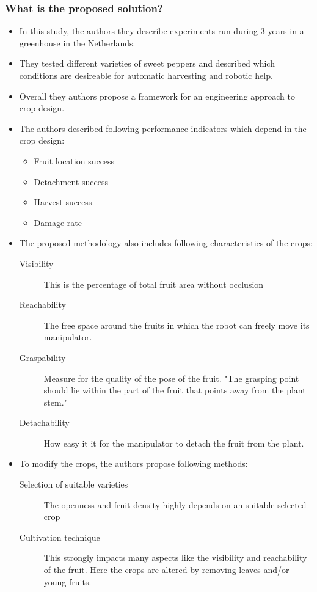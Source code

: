     \subsubsection*{What is the proposed solution?}
    \begin{itemize}
        \item In  this study, the authors they describe experiments run during 3 years in a greenhouse in the Netherlands.
        \item They tested different varieties of sweet peppers and described which conditions are desireable for automatic harvesting and robotic help.
        \item Overall they authors propose a framework for an engineering approach to crop design.
        \item The authors described following performance indicators which depend in the crop design: \begin{itemize}
            \item Fruit location success
            \item Detachment success
            \item Harvest success
            \item Damage rate
        \end{itemize}
        \item The proposed methodology also includes following characteristics of the crops: \begin{description}
            \item[Visibility] This is the percentage of total fruit area without occlusion
            \item[Reachability] The free space around the fruits in which the robot can freely move its manipulator.
            \item[Graspability] Measure for the quality of the pose of the fruit. "The grasping point should lie within the part of the fruit that points away from the plant stem."
            \item[Detachability] How easy it it for the manipulator to detach the fruit from the plant.
        \end{description}
        \item To modify the crops, the authors propose following methods: \
        \begin{description}
            \item[Selection of suitable varieties] The openness and fruit density highly depends on an suitable selected crop
            \item[Cultivation technique] This strongly impacts many aspects like the visibility and reachability of the fruit. Here the crops are altered by removing leaves and/or young fruits.

\end{description}
\end{itemize}
